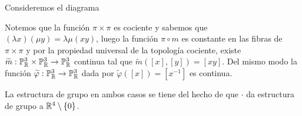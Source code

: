 \documentclass{article}
\begin{document}
\vspace{2mm}
\noindent Consideremos el diagrama

\centerline{
}
\vspace{2mm}
\noindent Notemos que la función $\pi\times\pi$ es cociente y sabemos que $(\lambda x)(\mu y)
=\lambda\mu (xy)$, luego la función $\pi\circ m$ es constante en las fibras de $\pi\times\pi$ y 
por la propiedad universal de la topología cociente, existe $\widetilde{m}:\mathbb{P}^{3}_{\mathbb{R}}
\times\mathbb{P}^{3}_{\mathbb{R}}\to\mathbb{P}^{3}_{\mathbb{R}}$ continua tal que $\widetilde{m}([x],[y])=[xy]$. 
Del mismo modo la función $\widetilde{\varphi}:\mathbb{P}^{3}_{\mathbb{R}}\to\mathbb{P}^{3}_{\mathbb{R}}$ dada por
$\widetilde{\varphi}([x])=[x^{-1}]$ es continua. 

\vspace{2mm}
\noindent La estructura de grupo en ambos casos se tiene del hecho de que $\cdot$ da estructura de 
grupo a $\mathbb{R}^{4}\setminus\{0\}$.

\end{document}
